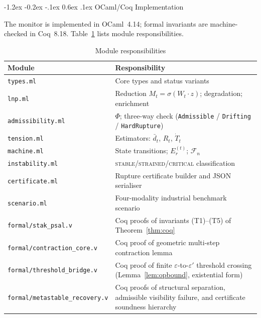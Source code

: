 \documentclass{llncs}
\makeatletter
\renewcommand\section{\@startsection{section}{1}{\z@}%
  {-1.2ex \@plus -0.2ex \@minus -.1ex}%
  {0.6ex \@plus .1ex}%
  {\normalfont\large\bfseries}}
\newcommand{\st}[1]{\textup{\textsc{#1}}}
\makeatother
\begin{document}
\section{OCaml/Coq Implementation}
\label{sec:impl}

The monitor is implemented in OCaml~4.14; formal invariants are
machine-checked in Coq~8.18. Table~\ref{tab:modules} lists module
responsibilities.

\begin{table}[H]
\centering
\caption{Module responsibilities}
\label{tab:modules}
\small
\begin{tabular}{l>{\raggedright\arraybackslash}p{.58\linewidth}}
\toprule
\textbf{Module} & \textbf{Responsibility} \\
\midrule
\texttt{types.ml}
  & Core types and status variants \\
\texttt{lnp.ml}
  & Reduction $M_t = \sigma(W_t \cdot z)$; degradation; enrichment \\
\texttt{admissibility.ml}
  & $\Phi$; three-way check (\texttt{Admissible} / \texttt{Drifting} / \texttt{HardRupture}) \\
\texttt{tension.ml}
  & Estimators: $\bar{d}_t$, $R_t$, $\dot{T}_t$ \\
\texttt{machine.ml}
  & State transitions; $E_r^{(t)}$; $\mathcal{F}_n$ \\
\texttt{instability.ml}
  & \st{stable}/\st{strained}/\st{critical} classification \\
\texttt{certificate.ml}
  & Rupture certificate builder and JSON serialiser \\
\texttt{scenario.ml}
  & Four-modality industrial benchmark scenario \\
\texttt{formal/stak\_psal.v}
  & Coq proofs of invariants (T1)--(T5) of Theorem~\ref{thm:coq} \\
\texttt{formal/contraction\_core.v}
  & Coq proof of geometric multi-step contraction lemma \\
\texttt{formal/threshold\_bridge.v}
  & Coq proof of finite $\varepsilon$-to-$\varepsilon'$ threshold
    crossing (Lemma~\ref{lem:opbound}, existential form) \\
\texttt{formal/metastable\_recovery.v}
  & Coq proofs of structural separation, admissible visibility
    failure, and certificate soundness hierarchy \\
\bottomrule
\end{tabular}
\end{table}
\end{document}
